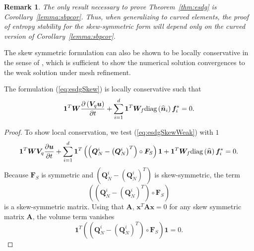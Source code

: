 \documentclass[review]{siamart0216}
\newtheorem*{remark}{Remark}
\theoremstyle{assumption}
\renewcommand{\hat}[1]{\widehat{#1}}
\newcommand{\pd}[2]{\frac{\partial#1}{\partial#2}}
\newcommand{\LRp}[1]{\left( #1 \right)}
\newcommand{\diag}[1]{{\rm diag}\LRp{#1}}
\begin{document}
\begin{remark}
The only result necessary to prove Theorem~\ref{thm:esdg} is Corollary~\ref{lemma:sbpcor}.  Thus, when generalizing to curved elements, the proof of entropy stability for the skew-symmetric form will depend only on the curved version of Corollary~\ref{lemma:sbpcor}.
\end{remark}

The skew symmetric formulation can also be shown to be locally conservative in the sense of \cite{shi2017local}, which is sufficient to show the numerical solution convergences to the weak solution under mesh refinement.  
\begin{theorem}
The formulation (\ref{eq:esdgSkew}) is locally conservative such that
\begin{align}
\bm{1}^T\bm{W}\pd{\LRp{\bm{V}_q\bm{u}}}{t} + \sum_{i=1}^d\bm{1}^T\bm{W}_f \diag{\hat{\bm{n}}_i}\bm{f}_i^* = 0. 
\end{align}
\end{theorem}
\begin{proof}
To show local conservation, we test (\ref{eq:esdgSkewWeak}) with $1$  %
\begin{align}
\bm{1}^T\bm{W}\bm{V}_q\pd{\bm{u}}{t} + \sum_{i=1}^d
\bm{1}^T
\LRp{\LRp{\bm{Q}^i_N - \LRp{\bm{Q}^i_N}^T} \circ \bm{F}_S}\bm{1} + \bm{1}^T\bm{W}_f \diag{\hat{\bm{n}}}\bm{f}_i^* = 0. 
\end{align}
Because $\bm{F}_S$ is symmetric and $\LRp{\bm{Q}^i_N - \LRp{\bm{Q}^i_N}^T}$ is skew-symmetric, the term 
\[
\LRp{\LRp{\bm{Q}^i_N - \LRp{\bm{Q}^i_N}^T} \circ \bm{F}_S}
\]
is a skew-symmetric matrix.  Using that $\bm{A}$, $\bm{x}^T\bm{A}\bm{x} = 0$ for any skew symmetric matrix $\bm{A}$, the volume term vanishes
\[
\bm{1}^T\LRp{\LRp{\bm{Q}^i_N - \LRp{\bm{Q}^i_N}^T} \circ \bm{F}_S}\bm{1} = 0.
\]
\end{proof}
\end{document}
